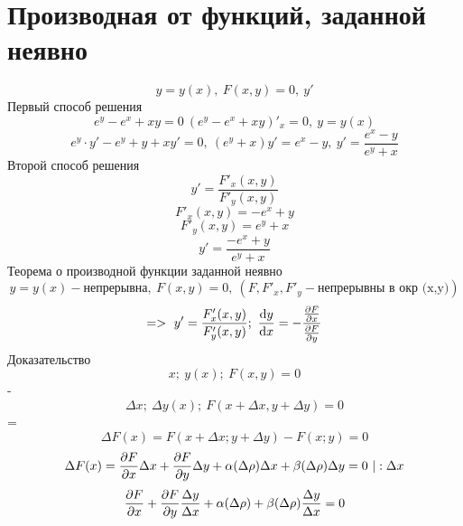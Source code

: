 \documentclass{article}
\begin{document}
\section{Производная от функций, заданной неявно}
\begin{equation*}
    y=y(x),\ F(x,y)=0,\ y'
\end{equation*}
Первый способ решения
\begin{equation*}
    e^y-e^x+xy=0\ (e^y-e^x+xy)'_x=0,\ y = y(x)
\end{equation*}
\begin{equation*}
    e^y\cdot y'-e^y+y+xy'=0,\ (e^y+x)y' = e^x-y,\ y' = \frac{e^x-y}{e^y+x}
\end{equation*}
Второй способ решения
\begin{equation}
    y' = \frac{F'_x(x,y)}{F'_y(x,y)}
\end{equation}
\begin{equation*}
    F'_x(x,y) = -e^x+y
\end{equation*}
\begin{equation*}
    F'_y(x,y) = e^y+x
\end{equation*}
\begin{equation*}
    y' = \frac{-e^x+y}{e^y+x}
\end{equation*}
Теорема о производной функции заданной неявно
\begin{equation*}
    y= y(x)- \text{непрерывна},\ F(x,y) = 0,\ (F,F'_x,F'_y - \text{непрерывны в окр (x,y)})
\end{equation*}
\begin{equation}
    =>\ y' = \frac{F'_x(x,y)}{F'_y(x,y)};\ \dv{y}{x}= -\frac{\pdv{F}{x}(x,y)}{\pdv{F}{y}(x,y)}
\end{equation}
Доказательство
\begin{equation*}
    x;\ y(x);\ F(x,y) = 0
\end{equation*}
-
\begin{equation*}
    \Delta x;\ \Delta y(x);\ F(x+\Delta x,y+\Delta y) = 0
\end{equation*}
=
\begin{equation*}
    \Delta F(x) = F(x+\Delta x; y+ \Delta y) - F(x;y) = 0
\end{equation*}
\begin{equation*}
    \Delta F(x) = \pdv{F}{x}\Delta x + \pdv{F}{y}\Delta y + \alpha(\Delta \rho)\Delta x + \beta (\Delta \rho) \Delta y = 0\ | :\Delta x
\end{equation*}
\begin{equation*}
     \pdv{F}{x} + \pdv{F}{y}\frac{\Delta y}{\Delta x} + \alpha(\Delta \rho) + \beta (\Delta \rho) \frac{\Delta y}{\Delta x} = 0
\end{equation*}
\end{document}
